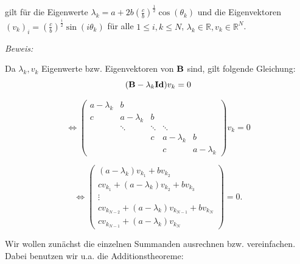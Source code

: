 gilt für die Eigenwerte $\lambda_{k} = a + 2b\left(\frac{c}{b}\right)^{\frac{1}{2}} \cos(\theta_{k})$ und die Eigenvektoren\\
$(v_{k})_{i} = \left(\frac{c}{b}\right)^{\frac{i}{2}} \sin(i \theta_{k})$ für alle $1 \le i,k \le N$, $\lambda_{k} \in \mathbb{R}, v_{k} \in \mathbb{R}^{N}$.

\textit{Beweis:}

Da $\lambda_{k}, v_{k}$ Eigenwerte bzw. Eigenvektoren von ${\textbf{B}}$ sind, gilt folgende Gleichung:
\begin{equation}
({\textbf{B}} - \lambda_{k} {\textbf{Id}}) v_{k} = 0
\end{equation}

\begin{equation}
\Longleftrightarrow
\begin{pmatrix}
a - \lambda_{k} & b\\
c & a - \lambda_{k} & b\\
  & \ddots & \ddots & \ddots\\
  &		   & c & a - \lambda_{k} & b\\
  &		   &  & c & a - \lambda_{k}
\end{pmatrix}
v_{k} = 0
\end{equation}

\begin{equation}
\Longleftrightarrow
\begin{pmatrix}
(a - \lambda_{k}) v_{k_{1}} + b v_{k_{2}}\\
c v_{k_{1}} + (a - \lambda_{k}) v_{k_{2}} + b v_{k_{3}}\\
\vdots\\
c v_{k_{N-2}} + (a - \lambda_{k}) v_{k_{N-1}} + b v_{k_{N}}\\
c v_{k_{N-1}} + (a - \lambda_{k}) v_{k_{N}}
\end{pmatrix}
= 0.
\end{equation}

Wir wollen zunächst die einzelnen Summanden ausrechnen bzw. vereinfachen. Dabei benutzen wir u.a. die Additionstheoreme:

